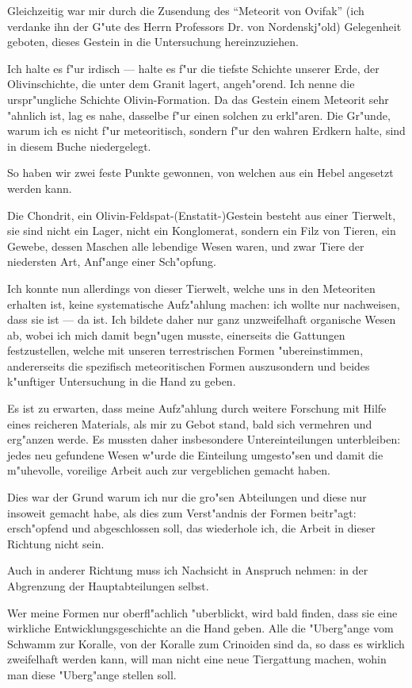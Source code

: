 \documentclass[a4paper, 11pt, oneside]{article}
\begin{document}
Gleichzeitig war mir durch die Zusendung des "`Meteorit von Ovifak"' (ich verdanke ihn der G"ute des Herrn Professors Dr. von Nordenskj"old) Gelegenheit geboten, dieses Gestein in die Untersuchung hereinzuziehen.

Ich halte es f"ur irdisch --- halte es f"ur die tiefste Schichte unserer Erde, der Olivinschichte, die unter dem Granit lagert, angeh"orend. Ich nenne die urspr"ungliche Schichte Olivin-Formation. Da das Gestein einem Meteorit sehr "ahnlich ist, lag es nahe, dasselbe f"ur einen solchen zu erkl"aren. Die Gr"unde, warum ich es nicht f"ur meteoritisch, sondern f"ur den wahren Erdkern halte, sind in diesem Buche niedergelegt.

So haben wir zwei feste Punkte gewonnen, von welchen aus ein Hebel angesetzt werden kann.

Die Chondrit, ein Olivin-Feldspat-(Enstatit-)Gestein besteht aus einer Tierwelt, sie sind nicht ein Lager, nicht ein Konglomerat, sondern ein Filz von Tieren, ein Gewebe, dessen Maschen alle lebendige Wesen waren, und zwar Tiere der niedersten Art, Anf"ange einer Sch"opfung.

Ich konnte nun allerdings von dieser Tierwelt, welche uns in den Meteoriten erhalten ist, keine systematische Aufz"ahlung machen: ich wollte nur nachweisen, dass sie ist --- da ist. Ich bildete daher nur ganz unzweifelhaft organische Wesen ab, wobei ich mich damit begn"ugen musste, einerseits die Gattungen festzustellen, welche mit unseren terrestrischen Formen "ubereinstimmen, andererseits die spezifisch meteoritischen Formen auszusondern und beides k"unftiger Untersuchung in die Hand zu geben.

Es ist zu erwarten, dass meine Aufz"ahlung durch weitere Forschung mit Hilfe eines reicheren Materials, als mir zu Gebot stand, bald sich vermehren und erg"anzen werde. Es mussten daher insbesondere Untereinteilungen unterbleiben: jedes neu gefundene Wesen w"urde die Einteilung umgesto"sen und damit die m"uhevolle, voreilige Arbeit auch zur vergeblichen gemacht haben.

Dies war der Grund warum ich nur die gro"sen Abteilungen und diese nur insoweit gemacht habe, als dies zum Verst"andnis der Formen beitr"agt: ersch"opfend und abgeschlossen soll, das wiederhole ich, die Arbeit in dieser Richtung nicht sein.

Auch in anderer Richtung muss ich Nachsicht in Anspruch nehmen: in der Abgrenzung der Hauptabteilungen selbst.

Wer meine Formen nur oberfl"achlich "uberblickt, wird bald finden, dass sie eine wirkliche Entwicklungsgeschichte an die Hand geben. Alle die "Uberg"ange vom Schwamm zur Koralle, von der Koralle zum Crinoiden sind da, so dass es wirklich zweifelhaft werden kann, will man nicht eine neue Tiergattung machen, wohin man diese "Uberg"ange stellen soll.
\end{document}
